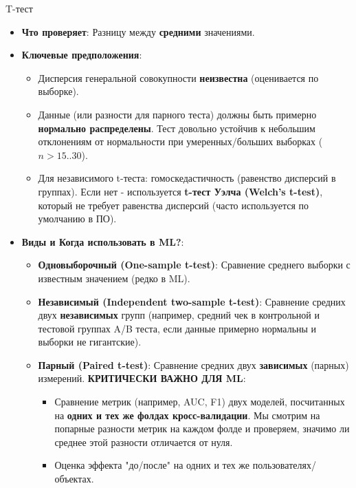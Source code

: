 \begin{myexampleblock}{T-тест}
\begin{itemize}
    \item \textbf{Что проверяет}: Разницу между \textbf{средними} значениями.
    \item \textbf{Ключевые предположения}:
        \begin{itemize}
            \item Дисперсия генеральной совокупности \textbf{неизвестна} (оценивается по выборке).
            \item Данные (или разности для парного теста) должны быть примерно \textbf{нормально распределены}. Тест довольно устойчив к небольшим отклонениям от нормальности при умеренных/больших выборках ($n > 15..30$).
            \item Для независимого t-теста: гомоскедастичность (равенство дисперсий в группах). Если нет - используется \textbf{t-тест Уэлча (Welch's t-test)}, который не требует равенства дисперсий (часто используется по умолчанию в ПО).
        \end{itemize}
    \item \textbf{Виды и Когда использовать в ML?}:
        \begin{itemize}
            \item \textbf{Одновыборочный (One-sample t-test)}: Сравнение среднего выборки с известным значением (редко в ML).
            \item \textbf{Независимый (Independent two-sample t-test)}: Сравнение средних двух \textbf{независимых} групп (например, средний чек в контрольной и тестовой группах A/B теста, если данные примерно нормальны и выборки не гигантские).
            \item \textbf{Парный (Paired t-test)}: Сравнение средних двух \textbf{зависимых} (парных) измерений. \textbf{КРИТИЧЕСКИ ВАЖНО ДЛЯ ML}:
                \begin{itemize}
                    \item Сравнение метрик (например, AUC, F1) двух моделей, посчитанных на \textbf{одних и тех же фолдах кросс-валидации}. Мы смотрим на попарные разности метрик на каждом фолде и проверяем, значимо ли среднее этой разности отличается от нуля.
                    \item Оценка эффекта "до/после" на одних и тех же пользователях/объектах.
                \end{itemize}
        \end{itemize}
\end{itemize}
\end{myexampleblock}

